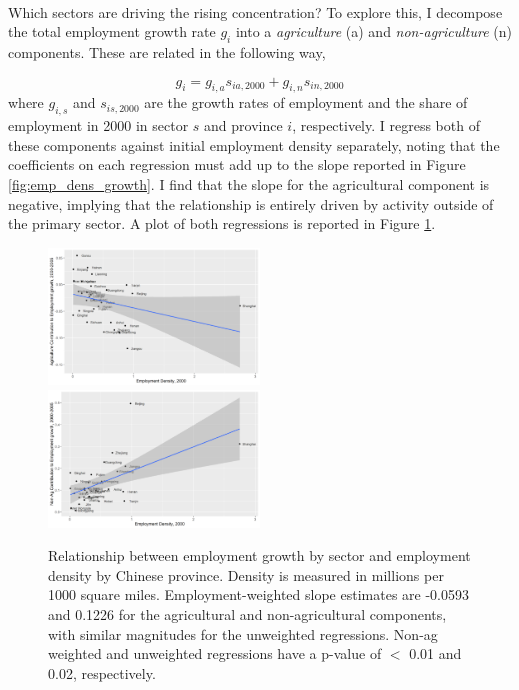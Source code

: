 \documentclass[]{article}
\theoremstyle{plain}
\begin{document}
\paragraph*{}
Which sectors are driving the rising concentration? To explore this, I decompose the total employment growth rate $g_{i}$ into a \textit{agriculture} (a) and \textit{non-agriculture} (n) components. These are related in the following way,

\begin{equation*}
g_{i} = g_{i, a}s_{ia, 2000} + g_{i, n}s_{in, 2000}
\end{equation*}
where $g_{i, s}$ and $s_{is, 2000}$ are the growth rates of employment and the share of employment in 2000 in sector $s$ and province $i$, respectively. I regress both of these components against initial employment density separately, noting that the coefficients on each regression must add up to the slope reported in Figure \ref{fig:emp_dens_growth}. I find that the slope for the agricultural component is negative, implying that the relationship is entirely driven by activity outside of the primary sector. A plot of both regressions is reported in Figure \ref{fig:na_emp_dens_growth}.

\begin{center}
	\begin{figure}[h]
		\includegraphics[width=0.5\textwidth]{ag_cont_growth_density.png}
		\includegraphics[width=0.5\textwidth]{na_cont_growth_density.png}
		\caption{Relationship between employment growth by sector and employment density by Chinese province. Density is measured in millions per 1000 square miles. Employment-weighted slope estimates are -0.0593 and 0.1226 for the agricultural and non-agricultural components, with similar magnitudes for the unweighted regressions. Non-ag weighted and unweighted regressions have a p-value of $<$ 0.01 and 0.02, respectively.}
		\label{fig:na_emp_dens_growth}
	\end{figure}
\end{center}
\end{document}
